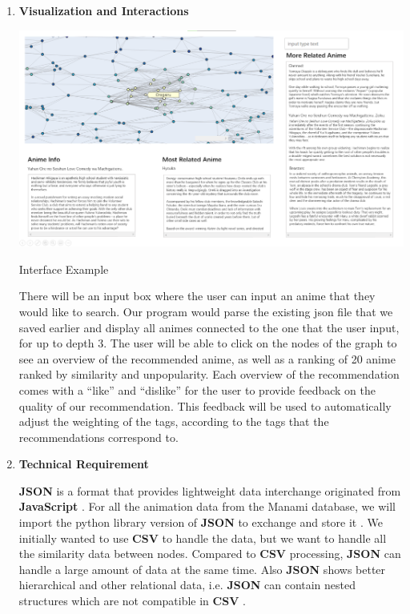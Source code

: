 \documentclass[fontsize=11pt]{article}
\begin{document}
\begin{enumerate}
    \item \textbf{Visualization and Interactions}
    
    \begin{center}
        \includegraphics[scale=.2]{Interface Example.png}
        
        Interface Example
    \end{center}
    
    \quad There will be an input box where the user can input an anime that they would like to search. Our program would parse the existing json file that we saved earlier and display all animes connected to the one that the user input, for up to depth 3. The user will be able to click on the nodes of the graph to see an overview of the recommended anime, as well as a ranking of 20 anime ranked by similarity and unpopularity. Each overview of the recommendation comes with a “like” and “dislike” for the user to provide feedback on the quality of our recommendation. This feedback will be used to automatically adjust the weighting of the tags, according to the tags that the recommendations correspond to.
    
    \item \textbf{Technical Requirement}
    
    \quad \textbf{JSON} is a format that provides lightweight data interchange originated from \textbf{JavaScript} \citep{JSON21}. For all the animation data from the Manami database, we will import the python library version of \textbf{JSON} to exchange and store it \citep{Pyjson}. We initially wanted to use \textbf{CSV} to handle the data, but we want to handle all the similarity data between nodes. Compared to \textbf{CSV} processing, \textbf{JSON} can handle a large amount of data at the same time. Also \textbf{JSON} shows better hierarchical and other relational data, i.e. \textbf{JSON} can contain nested structures which are not compatible in \textbf{CSV} \citep{vs21}.
    

\end{enumerate}
\end{document}
